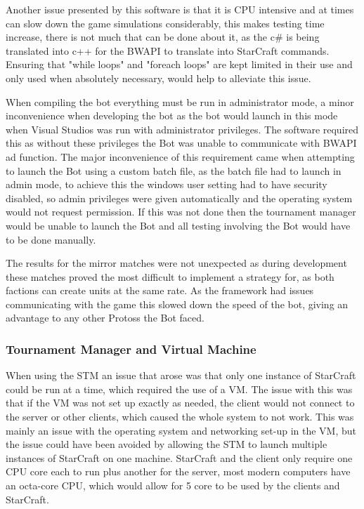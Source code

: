 \documentclass[journal]{IEEEtran}
\begin{document}
	Another issue presented by this software is that it is CPU intensive and at times can slow down the game simulations considerably, this makes testing time increase, there is not much that can be done about it, as the c\# is being translated into c++ for the BWAPI to translate into StarCraft commands. Ensuring that "while loops" and "foreach loops" are kept limited in their use and only used when absolutely necessary, would help to alleviate this issue.
	
	When compiling the bot everything must be run in administrator mode, a minor inconvenience when developing the bot as the bot would launch in this mode when Visual Studios was run with administrator privileges. The software required this as without these privileges the Bot was unable to communicate with BWAPI ad function. The major inconvenience of this requirement came when attempting to launch the Bot using a custom batch file, as the batch file had to launch in admin mode, to achieve this the windows user setting had to have security disabled, so admin privileges were given automatically and the operating system would not request permission. If this was not done then the tournament manager would be unable to launch the Bot and all testing involving the Bot would have to be done manually.
	
	The results for the mirror matches were not unexpected as during development these matches proved the most difficult to implement a strategy for, as both factions can create units at the same rate. As the framework had issues communicating with the game this slowed down the speed of the bot, giving an advantage to any other Protoss the Bot faced. 
	\newline
	\subsubsection{Tournament Manager and Virtual Machine}
	When using the STM an issue that arose was that only one instance of StarCraft could be run at a time, which required the use of a VM. The issue with this was that if the VM was not set up exactly as needed, the client would not connect to the server or other clients, which caused the whole system to not work. This was mainly an issue with the operating system and networking set-up in the VM, but the issue could have been avoided by allowing the STM to launch multiple instances of StarCraft on one machine. StarCraft and the client only require one CPU core each to run plus another for the server, most modern computers have an octa-core CPU, which would allow for 5 core to be used by the clients and StarCraft. 
	
\end{document}
